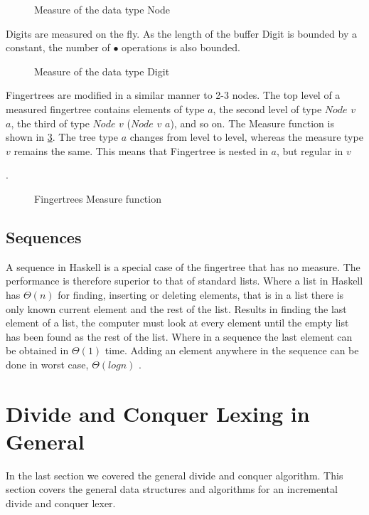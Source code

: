 \begin{figure}[h!]

\caption{Measure of the data type Node \label{fig:measureNode}}
\end{figure}

Digits are measured on the fly. As the length of the buffer Digit is bounded by
a constant, the number of $\bullet$ operations is also bounded.

\begin{figure}[h!]

\caption{Measure of the data type Digit \label{fig:measureDigit}}
\end{figure}

Fingertrees are modified in a similar manner to 2-3 nodes.
The top level of a measured fingertree contains elements of type $a$, the second
level of type $Node$ $v$ $a$, the third of type $Node$ $v$ ($Node$ $v$ $a$), and
so on. The Measure function is shown in \cref{fig:measureFingerTree}. The tree 
type $a$ changes from level to level, whereas the measure type $v$ remains the 
same. This means that Fingertree is nested in $a$, but regular in $v$ 

\cite{fingertree}.
\begin{figure}[h!]

\caption{Fingertrees Measure function \label{fig:measureFingerTree}}
\end{figure}


\subsection{Sequences}
A sequence in Haskell is a special case of the fingertree that has no measure.
The performance is therefore superior to that of standard lists. Where a list in
Haskell has $\Theta(n)$ for finding, inserting or deleting elements, that is in
a list there is only known current element and the rest of the list. Results in 
finding the last element of a list, the computer must look at every element
until the empty list has been found as the rest of the list. Where in a sequence
the last element can be obtained in $\Theta(1)$ time. Adding an element anywhere
in the sequence can be done in worst case, $\Theta(log n)$ \cite{fingertree}.

\section{Divide and Conquer Lexing in General}
In the last section we covered the general divide and conquer algorithm. This
section covers the general data structures and algorithms for an incremental
divide and conquer lexer.

